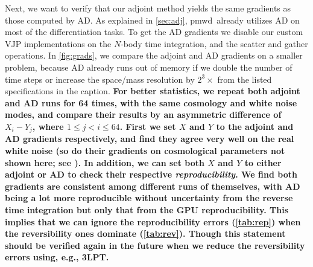 \documentclass[modern, dvipsnames]{aastex631}
\newcommand{\pmwd}{{\usefont{T1}{nova}{m}{sl}pmwd}}
\newcommand{\HL}[1]{\textcolor{Bittersweet}{\textbf{#1}}}
\begin{document}
Next, we want to verify that our adjoint method yields the same
gradients as those computed by AD.
As explained in \autoref{sec:adj}, \pmwd\ already utilizes AD on most of
the differentiation tasks.
To get the AD gradients we disable our custom VJP implementations on the
$N$-body time integration, and the scatter and gather operations.
In \autoref{fig:grads}, we compare the adjoint and AD gradients on a
smaller problem, because AD already runs out of memory if we double the
number of time steps or increase the space/mass resolution by
$2^3\times$ from the listed specifications in the caption.
\HL{For better statistics, we repeat both adjoint and AD runs for 64 times,
with the same cosmology and white noise modes, and compare their results
by an asymmetric difference of $X_i - Y_j$, where $1 \leq j < i \leq
64$.
First we set $X$ and $Y$ to the adjoint and AD gradients respectively,
and find they agree very well on the real white noise (so do their
gradients on cosmological parameters not shown here; see
\href{https://github.com/eelregit/pmwd/tree/master/docs/papers/adjoint/grads.txt}{\faFile}).
In addition, we can set both $X$ and $Y$ to either adjoint or AD to
check their respective \emph{reproducibility}.
We find both gradients are consistent among different runs of
themselves, with AD being a lot more reproducible without uncertainty
from the reverse time integration but only that from the GPU
reproducibility.
This implies that we can ignore the reproducibility errors
(\autoref{tab:rep}) when the reversibility ones dominate
(\autoref{tab:rev}).
Though this statement should be verified again in the future when we
reduce the reversibility errors using, e.g., 3LPT.}
\end{document}
